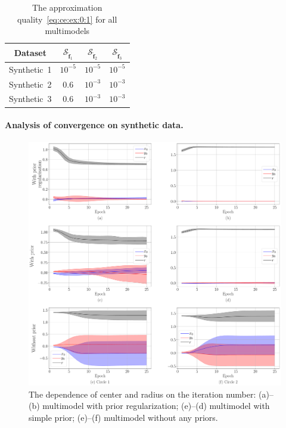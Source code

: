 \documentclass[12pt, twoside]{article}
\numberwithin{equation}{section}
\begin{document}
\begin{table}[h!t]
\begin{center}
\caption{The approximation quality~\eqref{eq:ce:ex:0:1} for all multimodels}
\label{tb:ce:1}
\begin{tabular}{|c|c|c|c|}
\hline
	Dataset & $\mathcal{S}_{\hat{\mathbf{f}}_1}$ & $\mathcal{S}_{\hat{\mathbf{f}}_2} $& $\mathcal{S}_{\hat{\mathbf{f}}_3} $\\
	\hline
	\multicolumn{1}{|l|}{Synthetic~1}
	& $10^{-5}$& $10^{-5}$& $10^{-5}$\\
	\hline
	\multicolumn{1}{|l|}{Synthetic~2}
	& $0.6$& $10^{-3}$& $10^{-3}$\\
	\hline
	\multicolumn{1}{|l|}{Synthetic~3}
	& $0.6$& $10^{-3}$& $10^{-3}$\\
\hline
\end{tabular}
\end{center}
\end{table}

\paragraph{Analysis of convergence on synthetic data.}
\begin{figure}[h!t]\center
\includegraphics[width=1\textwidth]{result_eng/experiment_synthetic_param_progress}
\caption{The dependence of center and radius on the iteration number: (a)--(b) multimodel with prior regularization; (e)--(d) multimodel with simple prior; (e)--(f) multimodel without any priors.}
\label{experiment:st:2:1}
\end{figure}
\end{document}
